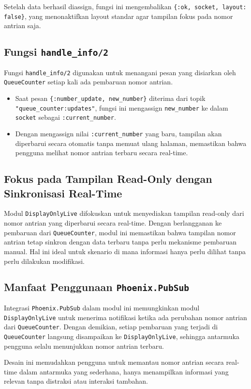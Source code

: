 Setelah data berhasil diassign, fungsi ini mengembalikan \texttt{\{:ok, socket, layout: false\}}, yang menonaktifkan layout standar agar tampilan fokus pada nomor antrian saja.

\subsection{Fungsi \texttt{handle\_info/2}}
Fungsi \texttt{handle\_info/2} digunakan untuk menangani pesan yang disiarkan oleh \texttt{QueueCounter} setiap kali ada pembaruan nomor antrian.
\begin{itemize}
	\item Saat pesan \texttt{\{:number\_update, new\_number\}} diterima dari topik \texttt{"queue\_counter:updates"}, fungsi ini mengassign \texttt{new\_number} ke dalam \texttt{socket} sebagai \texttt{:current\_number}.
	\item Dengan mengassign nilai \texttt{:current\_number} yang baru, tampilan akan diperbarui secara otomatis tanpa memuat ulang halaman, memastikan bahwa pengguna melihat nomor antrian terbaru secara real-time.
\end{itemize}

\subsection{Fokus pada Tampilan Read-Only dengan Sinkronisasi Real-Time}
Modul \texttt{DisplayOnlyLive} difokuskan untuk menyediakan tampilan read-only dari nomor antrian yang diperbarui secara real-time. Dengan berlangganan ke pembaruan dari \texttt{QueueCounter}, modul ini memastikan bahwa tampilan nomor antrian tetap sinkron dengan data terbaru tanpa perlu mekanisme pembaruan manual. Hal ini ideal untuk skenario di mana informasi hanya perlu dilihat tanpa perlu dilakukan modifikasi.

\subsection{Manfaat Penggunaan \texttt{Phoenix.PubSub}}
Integrasi \texttt{Phoenix.PubSub} dalam modul ini memungkinkan modul \texttt{DisplayOnlyLive} untuk menerima notifikasi ketika ada perubahan nomor antrian dari \texttt{QueueCounter}. Dengan demikian, setiap pembaruan yang terjadi di \texttt{QueueCounter} langsung disampaikan ke \texttt{DisplayOnlyLive}, sehingga antarmuka pengguna selalu menunjukkan nomor antrian terbaru.

Desain ini memudahkan pengguna untuk memantau nomor antrian secara real-time dalam antarmuka yang sederhana, hanya menampilkan informasi yang relevan tanpa distraksi atau interaksi tambahan.


